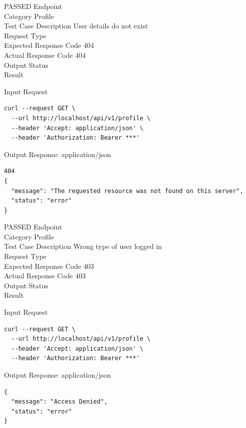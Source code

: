 \begin{testcase}{4}{PASSED}
Endpoint \hfill {}\\
Category \hfill Profile\\
Test Case Description \hfill User details do not exist\\

Request Type    \hfill {}\\
Expected Response Code    \hfill 404\\
Actual Response Code    \hfill 404\\

Output Status \hfill {}\\
Result \hfill {}

\begin{ipblock}{Input Request}
\begin{verbatim}
curl --request GET \
  --url http://localhost/api/v1/profile \
  --header 'Accept: application/json' \
  --header 'Authorization: Bearer ***'
\end{verbatim}
\end{ipblock}

\begin{opblock}{Output Response: application/json}
\begin{verbatim}
404
{
  "message": "The requested resource was not found on this server",
  "status": "error"
}
\end{verbatim}
\end{opblock}
\end{testcase}

\begin{testcase}{5}{PASSED}
Endpoint \hfill {}\\
Category \hfill Profile\\
Test Case Description \hfill Wrong type of user logged in\\

Request Type    \hfill {}\\
Expected Response Code    \hfill 403\\
Actual Response Code    \hfill 403\\

Output Status \hfill {}\\
Result \hfill \tcstatus{PASSED}

\begin{ipblock}{Input Request}
\begin{verbatim}
curl --request GET \
  --url http://localhost/api/v1/profile \
  --header 'Accept: application/json' \
  --header 'Authorization: Bearer ***'
\end{verbatim}
\end{ipblock}

\begin{opblock}{Output Response: application/json}
\begin{verbatim}
{
  "message": "Access Denied",
  "status": "error"
}
\end{verbatim}
\end{opblock}
\end{testcase}



